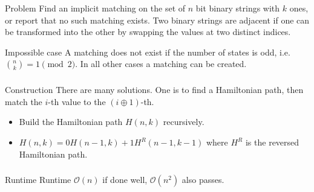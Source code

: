 \begin{frame}
    \frametitle{\problemtitle}
    \begin{block}{Problem}
        Find an implicit matching on the set of $n$ bit
        binary strings with $k$ ones, or report that
        no such matching exists.
        Two binary strings are adjacent if one can be 
        transformed into the other by swapping the values
        at two distinct indices.
    \end{block}
    \pause
    \begin{block}{Impossible case}
        A matching does not exist if the number of states
        is odd, i.e. $\binom{n}{k} = 1 \pmod{2}$. In all
        other cases a matching can be created.
    \end{block}
\end{frame}
\begin{frame}
    \frametitle{\problemtitle}
    \begin{block}{Construction}
        There are many solutions. One is to 
        find a Hamiltonian path, then match the 
        $i$-th value to the $(i \oplus 1)$-th.

        \begin{itemize}
            \item Build the Hamiltonian path $H(n, k)$ recursively.
            \item $H(n, k) = 0 H(n-1, k) + 1 H^R(n-1, k-1)$ where $H^R$ is the reversed Hamiltonian path.
        \end{itemize}
        

    \end{block}
\end{frame}



\begin{frame}
    \frametitle{\problemtitle}
    \begin{block}{Runtime}
        Runtime $\mathcal{O}(n)$ if done well, $\mathcal{O}(n^2)$ also passes.
    \end{block}
    \pause
    \solvestats
\end{frame}
